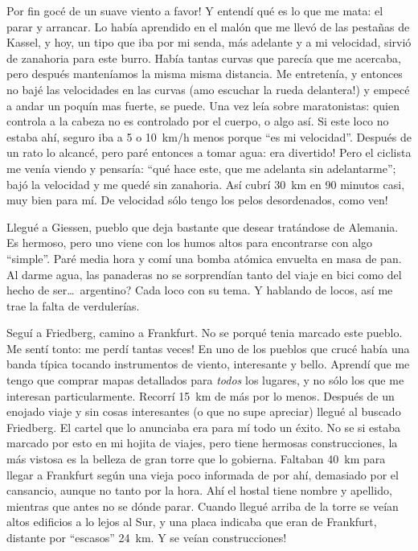 \textexclamdown Por fin goc\'e de un suave viento a favor! Y entend\'i qu\'e
es lo que me mata: el parar y arrancar. Lo hab\'ia aprendido en el mal\'on que
me llev\'o de las pesta\~nas de Kassel, y hoy, un tipo que iba por mi senda,
m\'as adelante y a mi velocidad, sirvi\'o de zanahoria para este burro.
Hab\'ia tantas curvas que parec\'ia que me acercaba, pero
despu\'es manten\'iamos la misma misma distancia. Me entreten\'ia, y entonces
no baj\'e las velocidades en las curvas (\textexclamdown amo escuchar la rueda
delantera!) y empec\'e a andar un poqu\'in mas fuerte, se puede. Una vez
le\'ia sobre maratonistas: quien controla a la cabeza no es controlado por el
cuerpo, o algo as\'i. Si este loco no estaba ah\'i, seguro iba a 5 o 10~km/h
menos porque ``es mi velocidad''. Despu\'es de un rato lo alcanc\'e, pero
par\'e entonces a tomar agua: \textexclamdown era divertido! Pero el ciclista me
ven\'ia viendo y pensar\'ia: ``qu\'e hace este, que me adelanta sin
adelantarme''; baj\'o la velocidad y me qued\'e sin zanahoria. As\'i cubr\'i
30~km en 90 minutos casi, muy bien para m\'i. \textexclamdown De velocidad
s\'olo tengo los pelos desordenados, como ven!

Llegu\'e a Giessen, pueblo que deja bastante que desear trat\'andose de
Alemania. Es hermoso, pero uno viene con los humos altos para encontrarse con
algo ``simple''. Par\'e media hora y com\'i una bomba at\'omica envuelta en
masa de pan. Al darme agua, las panaderas no se sorprend\'ian tanto del viaje
en bici como del hecho de ser\ldots\ \textquestiondown argentino? Cada loco
con su tema. Y hablando de locos, as\'i me trae la falta de verduler\'ias.

Segu\'i a Friedberg, camino a Frankfurt. No se porqu\'e tenia marcado este
pueblo. Me sent\'i tonto: \textexclamdown me perd\'i tantas veces! En uno de
los pueblos que cruc\'e hab\'ia una banda t\'ipica tocando instrumentos de
viento, interesante y bello. Aprend\'i que me tengo que comprar mapas
detallados para \emph{todos} los lugares, y no s\'olo los que me interesan
particularmente. Recorr\'i 15~km de m\'as por lo menos. Despu\'es de un
enojado viaje y sin cosas interesantes (o que no supe apreciar) llegu\'e al
buscado Friedberg. El cartel que lo anunciaba era para m\'i todo un \'exito.
No se si estaba marcado por esto en mi hojita de viajes, pero tiene hermosas
construcciones, la m\'as vistosa es la belleza de gran torre que lo gobierna.
Faltaban 40~km para llegar a Frankfurt seg\'un una vieja poco informada de por
ah\'i, demasiado por el cansancio, aunque no tanto por la hora. Ah\'i el
hostal tiene nombre y apellido, mientras que antes no se d\'onde parar. Cuando
llegu\'e arriba de la torre se ve\'ian altos edificios a lo lejos al Sur, y
una placa indicaba que eran de Frankfurt, distante por ``escasos'' 24~km.
\textexclamdown Y se ve\'ian construcciones!

